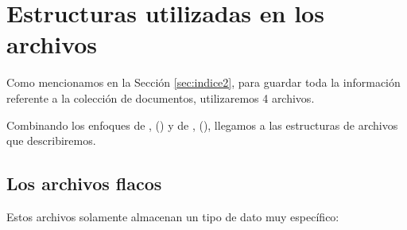 \section{Estructuras utilizadas en los archivos}

Como mencionamos en la Sección \ref{sec:indice2}, para guardar toda la información referente a la colección de documentos, utilizaremos 4 archivos.

Combinando los enfoques de \citet{Zhang:2008}, (\citeyear{Zhang:2008}) y de \citet[p.~107]{Buettcher2010}, (\citeyear{Buettcher2010}), llegamos a las estructuras de archivos que describiremos.


\subsection{Los archivos flacos}

Estos archivos solamente almacenan un tipo de dato muy específico:

